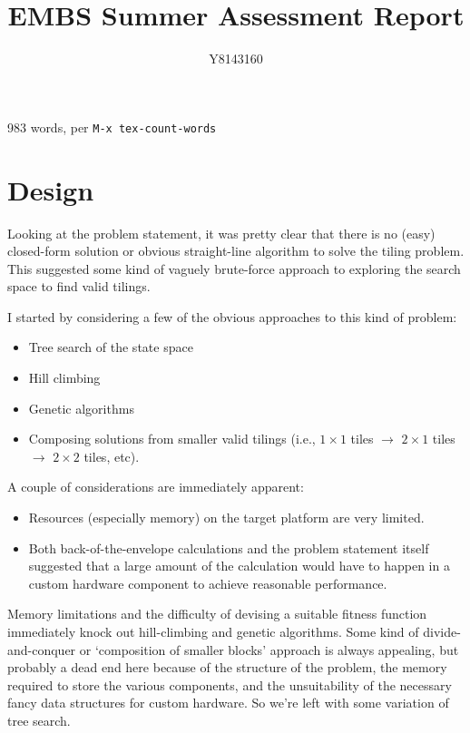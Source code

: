\documentclass[a4paper,12pt]{article}
\title{EMBS Summer Assessment Report}
\author{Y8143160}
\begin{document}
\maketitle

\begin{center}
  983 words, per \texttt{M-x tex-count-words}
\end{center}

\section{Design}

Looking at the problem statement, it was pretty clear that there is no
(easy) closed-form solution or obvious straight-line algorithm to
solve the tiling problem. This suggested some kind of vaguely
brute-force approach to exploring the search space to find valid
tilings.

I started by considering a few of the obvious approaches to this kind
of problem:

\begin{itemize}
\item Tree search of the state space
\item Hill climbing
\item Genetic algorithms
\item Composing solutions from smaller valid tilings (i.e., $1 \times
  1$ tiles $\rightarrow$ $2 \times 1$ tiles $\rightarrow$ $2 \times 2$
  tiles, etc).
\end{itemize}

A couple of considerations are immediately apparent:

\begin{itemize}
\item Resources (especially memory) on the target platform are very
  limited.
\item Both back-of-the-envelope calculations and the problem statement
  itself suggested that a large amount of the calculation would have
  to happen in a custom hardware component to achieve reasonable
  performance.
\end{itemize}

Memory limitations and the difficulty of devising a suitable fitness
function immediately knock out hill-climbing and genetic
algorithms. Some kind of divide-and-conquer or `composition of smaller
blocks' approach is always appealing, but probably a dead end here
because of the structure of the problem, the memory required to store
the various components, and the unsuitability of the necessary fancy
data structures for custom hardware. So we're left with some variation
of tree search.
\end{document}
